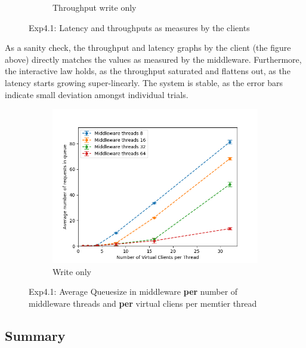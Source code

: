 \documentclass[11pt,a4paper]{article}
\begin{document}
\begin{figure}[H]
\begin{subfigure}{.5\textwidth}
    \caption{Throughput write only}
    \label{fig:mesh1}
\end{subfigure}
\caption{Exp4.1: Latency and throughputs as measures by the clients}
\label{fig:test}
\end{figure}

As a sanity check, the throughput and latency graphs by the client (the figure above) directly matches the values as measured by the middleware.
Furthermore, the interactive law holds, as the throughput saturated and flattens out, as the latency starts growing super-linearly.
The system is stable, as the error bars indicate small deviation amongst individual trials.

\begin{figure}[H]
\centering
\begin{subfigure}{.5\textwidth}
      \centering
    \includegraphics[width=\textwidth]{img/exp4_1/exp4_1__queuesize_middleware_write_1.png}
    \caption{Write only}
    \label{fig:mesh1}
\end{subfigure}
\caption{Exp4.1: Average Queuesize in middleware \textbf{per} number of middleware threads and \textbf{per} virtual cliens per memtier thread}
\label{fig:test}
\end{figure}


\subsection{Summary}
\end{document}

